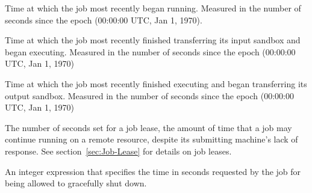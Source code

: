 \begin{description}
\label{JobCurrentStartDate-job-attribute}
\item[\AdAttr{JobCurrentStartDate}:]  Time at which the job most recently began
running.  Measured in the
number of seconds since the epoch (00:00:00 UTC, Jan 1, 1970).  

\label{JobCurrentStartExecutingDate-job-attribute}
\item[\AdAttr{JobCurrentStartExecutingDate}:]  Time at which the job most recently finished
transferring its input sandbox and began executing.  Measured in the
number of seconds since the epoch (00:00:00 UTC, Jan 1, 1970)

\label{JobCurrentStartTransferOutputDate-job-attribute}
\item[\AdAttr{JobCurrentStartTransferOutputDate}:]  Time at which the job most recently finished
executing and began transferring its output sandbox.  Measured in the
number of seconds since the epoch (00:00:00 UTC, Jan 1, 1970)


\item[\AdAttr{JobLeaseDuration}:]  The number of seconds set for
a job lease, the amount of time that a job may continue running
on a remote resource,
despite its submitting machine's lack of response.
See section~\ref{sec:Job-Lease} for details on job leases.

\item[\AdAttr{JobMaxVacateTime}:] An integer expression that specifies
the time in seconds requested by the job for being allowed to
gracefully shut down.


\end{description}

